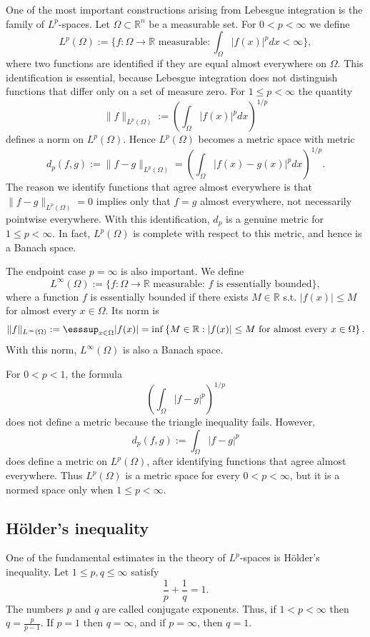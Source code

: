 One of the most important constructions arising from Lebesgue integration is the family of $L^p$-spaces. Let $\Omega \subset \mathbb{R}^{n}$ be a measurable set. For $0 < p < \infty$ we define
\[ L^{p}(\Omega) := \{f : \Omega \rightarrow \mathbb{R} \text{ measurable} : \int_{\Omega} |f(x)|^{p} dx < \infty\} , \]
where two functions are identified if they are equal almost everywhere on $\Omega$. This identification is essential, because Lebesgue integration does not distinguish functions that differ only on a set of measure zero. For $1 \le p < \infty$ the quantity
\[ \|f\|_{L^{p}(\Omega)} := \left(\int_{\Omega} |f(x)|^{p} dx\right)^{1/p} \]
defines a norm on $L^{p}(\Omega)$. Hence $L^{p}(\Omega)$ becomes a metric space with metric
\[ d_{p}(f,g) := \|f-g\|_{L^{p}(\Omega)} = \left(\int_{\Omega} |f(x)-g(x)|^{p} dx\right)^{1/p} . \]
The reason we identify functions that agree almost everywhere is that $\|f-g\|_{L^{p}(\Omega)} = 0$ implies only that $f=g$ almost everywhere, not necessarily pointwise everywhere. With this identification, $d_p$ is a genuine metric for $1 \le p < \infty$. In fact, $L^{p}(\Omega)$ is complete with respect to this metric, and hence is a Banach space.

The endpoint case $p = \infty$ is also important. We define
\[ L^{\infty}(\Omega) := \{f : \Omega \rightarrow \mathbb{R} \text{ measurable: } f \text{ is essentially bounded} \}, \]
where a function \(f\) is essentially bounded if there exists \(M \in \mathbb{R}\) s.t. \(\vert f(x) \vert \le M\) for almost every \(x \in \Omega\). Its norm is
\[ \|f\|_{L^{\infty}(\Omega)} := \esssup_{x \in \Omega} |f(x)| = \inf \left\{ M \in \mathbb{R}: \vert f(x) \vert \le M \text{ for almost every } x \in \Omega \right\}  . \]
With this norm, $L^{\infty}(\Omega)$ is also a Banach space.

For $0 < p < 1$, the formula
\[ \left(\int_{\Omega} |f-g|^{p}\right)^{1/p} \]
does not define a metric because the triangle inequality fails. However,
\[ d_{p}(f,g) := \int_{\Omega} |f-g|^{p} \]
does define a metric on $L^{p}(\Omega)$, after identifying functions that agree almost everywhere. Thus $L^{p}(\Omega)$ is a metric space for every $0 < p < \infty$, but it is a normed space only when $1 \le p < \infty$.

\subsection*{Hölder's inequality}

One of the fundamental estimates in the theory of $L^p$-spaces is Hölder's inequality. Let $1 \le p, q \le \infty$ satisfy
\[ \frac{1}{p} + \frac{1}{q} = 1 . \]
The numbers $p$ and $q$ are called conjugate exponents. Thus, if $1 < p < \infty$ then $q = \frac{p}{p-1}$. If $p = 1$ then $q = \infty$, and if $p = \infty$, then $q = 1$.

